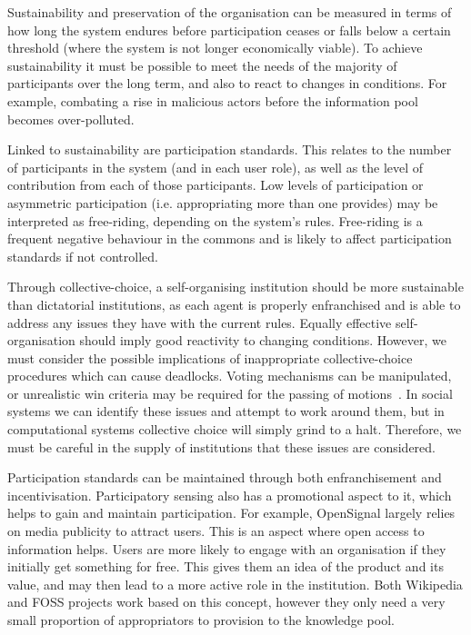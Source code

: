 Sustainability and preservation of the organisation can be measured in terms of how long the system endures before participation ceases or falls below a certain threshold (where the system is not longer economically viable). 
To achieve sustainability it must be possible to meet the needs of the majority of participants over the long term, and also to react to changes in conditions. 
For example, combating a rise in malicious actors before the information pool becomes over-polluted. 

Linked to sustainability are participation standards. 
This relates to the number of participants in the system (and in each user role), as well as the level of contribution from each of those participants. Low levels of participation or asymmetric participation (i.e. appropriating more than one provides) may be interpreted as free-riding, depending on the system's rules. 
Free-riding is a frequent negative behaviour in the commons and is likely to affect participation standards if not controlled.

Through collective-choice, a self-organising institution should be more sustainable than dictatorial institutions, as each agent is properly enfranchised and is able to address any issues they have with the current rules. 
Equally effective self-organisation should imply good reactivity to changing conditions. 
However, we must consider the possible implications of inappropriate collective-choice procedures which can cause deadlocks. 
Voting mechanisms can be manipulated, or unrealistic win criteria may be required for the passing of motions~\citep{Pitt2011b}. 
In social systems we can identify these issues and attempt to work around them, but in computational systems collective choice will simply grind to a halt. 
Therefore, we must be careful in the supply of institutions that these issues are considered.

Participation standards can be maintained through both enfranchisement and incentivisation. 
Participatory sensing also has a promotional aspect to it, which helps to gain and maintain participation. 
For example, OpenSignal largely relies on media publicity to attract users. 
This is an aspect where open access to information helps. 
Users are more likely to engage with an organisation if they initially get something for free. 
This gives them an idea of the product and its value, and may then lead to a more active role in the institution. 
Both Wikipedia and \ac{FOSS} projects work based on this concept, however they only need a very small proportion of appropriators to provision to the knowledge pool. 

